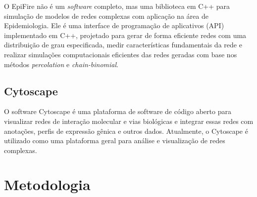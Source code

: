 \documentclass[
	12pt,				%
	openright,			%
	oneside,			%
	a4paper,			%
	main=brazil,
	english,			%
	]{ufsj-abntex2}
\begin{document}
O EpiFire \cite{epifire} não é um \textit{software} completo, mas uma biblioteca em C++ para simulação de modelos de redes complexas com aplicação na área de Epidemiologia. Ele é uma interface de programação de aplicativos (API) implementado em C++, projetado para gerar de forma eficiente redes com uma distribuição de grau especificada, medir características fundamentais da rede e realizar simulações computacionais eficientes das redes geradas com base nos métodos \textit{percolation} e \textit{chain-binomial}. 

\section{Cytoscape}

O software Cytoscape \cite{shannon2003cytoscape} é uma plataforma de software de código aberto para visualizar redes de interação molecular e vias biológicas e integrar essas redes com anotações, perfis de expressão gênica e outros dados. Atualmente, o Cytoscape é utilizado como uma plataforma geral para análise e visualização de redes complexas. 



\chapter{Metodologia}
\label{chap:metodologia}



\end{document}
